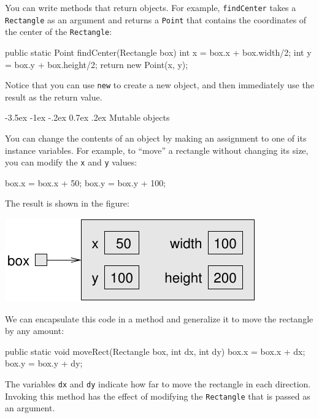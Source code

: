 \documentclass[12pt]{book}
\makeatletter
\renewcommand{\section}{\@startsection {section}{1}{\z@}%
    {-3.5ex \@plus -1ex \@minus -.2ex}%
    {0.7ex \@plus.2ex}%
    {\normalfont\Large\bfseries}}
\theoremstyle{exercise}
\newcommand{\java}[1]{\lstinline{#1}} %
\makeatother
\begin{document}

You can write methods that return objects.
For example, \java{findCenter} takes a \java{Rectangle} as an argument and returns a \java{Point} that contains the coordinates of the center of the \java{Rectangle}:

\begin{code}
    public static Point findCenter(Rectangle box) {
        int x = box.x + box.width/2;
        int y = box.y + box.height/2;
        return new Point(x, y);
    }
\end{code}

Notice that you can use \java{new} to create a new object, and then immediately use the result as the return value.


\section{Mutable objects}


You can change the contents of an object by making an assignment to one of its instance variables.
For example, to ``move'' a rectangle without changing its size, you can modify the \java{x} and \java{y} values:

\begin{code}
    box.x = box.x + 50;
    box.y = box.y + 100;
\end{code}

The result is shown in the figure:

\includegraphics{figs/rectangle2.pdf}


We can encapsulate this code in a method and generalize it to move the rectangle by any amount:

\begin{code}
    public static void moveRect(Rectangle box, int dx, int dy) {
        box.x = box.x + dx;
        box.y = box.y + dy;
    }
\end{code}

The variables \java{dx} and \java{dy} indicate how far to move the rectangle in each direction.
Invoking this method has the effect of modifying the \java{Rectangle} that is passed as an argument.
\end{document}
